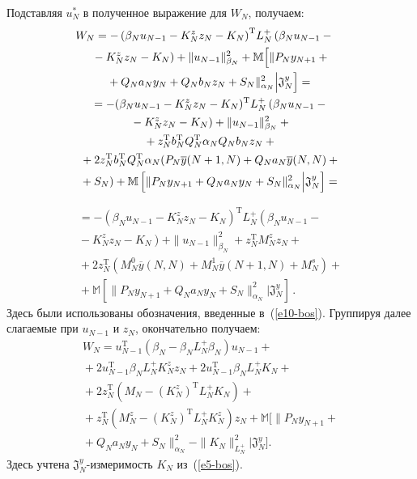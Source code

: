 \begin{multicols}{2}
 Подставляя $u_N^*$ в полученное выражение для $W_N$, получаем:
 \begin{multline*}
\hspace*{-3mm}W_N= -\left(\beta_N u_{N-1} -K^z_N z_N -K_N\right)^{\mathrm{T}}\! L^+_N
 \left(\beta_N u_{N-1} -{}\right.\\
\left. {}-
K^z_N z_N -K_N\right) +\| u_{N-1}\|^2_{\beta_N}+
\mathbb{M} \Big[ \| P_N y_{N+1} +{}\\
 {}+Q_N a_N y_N +Q_N b_N z_N +S_N
\|^2_{\alpha_N}\Big\vert \mathfrak{J}^y_N\Big]={}\\
 {}=-(\beta_N u_{N-1} -K^z_N z_N -K_N)^{\mathrm{T}} L^+_N \left(\beta_N u_{N-1} -{}\right.\\
 \left. {}-
K^z_N z_N -K_N\right) +\|u_{N-1}\|^2_{\beta_N}+{}\\
{}+
z_N^{\mathrm{T}} b_N^{\mathrm{T}} Q_N^{\mathrm{T}} \alpha_N Q_N b_N z_N +{}\\
{}+2z_N^{\mathrm{T}} b_N^{\mathrm{T}} Q_N^{\mathrm{T}} \alpha_N
(P_N \overline{y} (N+1,N) +Q_N a_N \overline{y} (N,N)+{}\\
{}+S_N)+\mathbb{M}\left[ \| P_N y_{N+1} +Q_N a_N y_N +S_N
\|^2_{\alpha_N}\Big\vert \mathfrak{J}_N^y\right]={}
\end{multline*}

\noindent
\begin{multline*}
 {}=-(\beta_N u_{N-1} -K^z_N z_N -K_N)^{\mathrm{T}} L_N^+ \left(\beta_N u_{N-1} -{}\right.\\[1pt]
\left. {}-
K_N^z z_N -K_N\right)+\|u_{N-1}\|^2_{\beta_N}+
z_N^{\mathrm{T}} M^z_N z_N +{}\\[1pt]
{}+2z_N^{\mathrm{T}}(M_N^0 \overline{y}(N,N) +M^1_N
\overline{y}(N+1,N) +M_N^s)+{}\\[1pt]
 {}+\mathbb{M}\left[ \| P_N y_{N+1} +Q_N a_N y_N +S_N \|^2_{\alpha_N}
\Big\vert \mathfrak{J}^y_N\right]\,.
 \end{multline*}
 Здесь были использованы обозначения, введенные в~(\ref{e10-bos}).
Группируя далее слагаемые при $u_{N-1}$ и $z_N$, окончательно получаем:
 \begin{multline*}
 W_N =u_{N-1}^{\mathrm{T}} (\beta_N -\beta_N L_N^+ \beta_N) u_{N-1} +{}\\[1pt]
 {}+
 2u^{\mathrm{T}}_{N-1} \beta_N L^+_N K^z_N z_N +2u^{\mathrm{T}}_{N-1} \beta_N L^+_N
K_N+{}\\[1pt]
 {} +2 z_N^{\mathrm{T}} (M_N-(K_N^z)^{\mathrm{T}} L_N^+ K_N) +{}\\[1pt]
 {}+z_N^{\mathrm{T}} (M_N^z-(K_N^z)^{\mathrm{T}}
L_N^+ K_N^z)z_N+\mathbb{M}\Big[ \| P_N y_{N+1} +{}\\[1pt]
 {}+Q_N a_N y_N +S_N \|^2_{\alpha_N}
-\| K_N\|^2_{L^+_N}\Big\vert \mathfrak{J}^y_N\Big].
 \end{multline*}
 Здесь учтена $\mathfrak{J}^y_N$-измеримость $K_N$ из~(\ref{e5-bos}).


\end{multicols}

